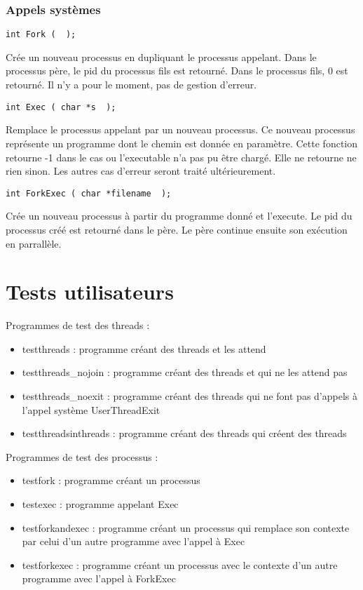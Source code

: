 \documentclass{report}
\begin{document}
\subsection{Appels systèmes}

\begin{verbatim}
int Fork (  );
\end{verbatim}
Crée un nouveau processus en dupliquant le processus appelant. Dans le processus père, le pid du processus fils est retourné. Dans le processus fils, 0 est retourné. 
Il n'y a pour le moment, pas de gestion d'erreur.

\begin{verbatim}
int Exec ( char *s  );
\end{verbatim}
Remplace le processus appelant par un nouveau processus. Ce nouveau processus représente un programme dont le chemin est donnée en paramètre.
Cette fonction retourne -1 dans le cas ou l'executable n'a pas pu être chargé. Elle ne retourne ne rien sinon. Les autres cas d'erreur seront traité ultérieurement. 

\begin{verbatim}
int ForkExec ( char *filename  );
\end{verbatim}
Crée un nouveau processus à partir du programme donné et l'execute. Le pid du processus créé est retourné dans le père.
Le père continue ensuite son exécution en parrallèle.


\chapter{Tests utilisateurs}

Programmes de test des threads :

\begin{itemize}
\item testthreads : programme créant des threads et les attend
\item testthreads_nojoin : programme créant des threads et qui ne les attend pas
\item testthreads_noexit : programme créant des threads qui ne font pas d'appels à l'appel système UserThreadExit
\item testthreadsinthreads : programme créant des threads qui créent des threads
\end{itemize}

Programmes de test des processus :

\begin{itemize}
\item testfork : programme créant un processus
\item testexec : programme appelant Exec
\item testforkandexec : programme créant un processus qui remplace son contexte par celui d'un autre programme avec l'appel à Exec
\item testforkexec : programme créant un processus avec le contexte d'un autre programme avec l'appel à ForkExec
\end{itemize}
\end{document}
